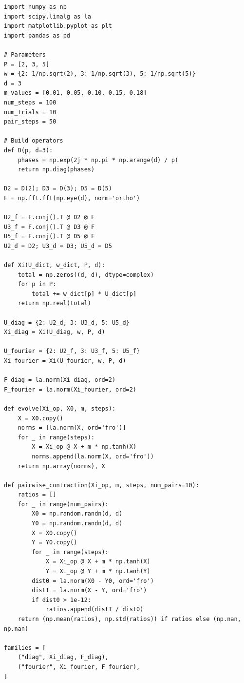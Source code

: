 \documentclass[11pt]{article}
\begin{document}
\begin{verbatim}
import numpy as np
import scipy.linalg as la
import matplotlib.pyplot as plt
import pandas as pd

# Parameters
P = [2, 3, 5]
w = {2: 1/np.sqrt(2), 3: 1/np.sqrt(3), 5: 1/np.sqrt(5)}
d = 3
m_values = [0.01, 0.05, 0.10, 0.15, 0.18]
num_steps = 100
num_trials = 10
pair_steps = 50

# Build operators
def D(p, d=3):
    phases = np.exp(2j * np.pi * np.arange(d) / p)
    return np.diag(phases)

D2 = D(2); D3 = D(3); D5 = D(5)
F = np.fft.fft(np.eye(d), norm='ortho')

U2_f = F.conj().T @ D2 @ F
U3_f = F.conj().T @ D3 @ F
U5_f = F.conj().T @ D5 @ F
U2_d = D2; U3_d = D3; U5_d = D5

def Xi(U_dict, w_dict, P, d):
    total = np.zeros((d, d), dtype=complex)
    for p in P:
        total += w_dict[p] * U_dict[p]
    return np.real(total)

U_diag = {2: U2_d, 3: U3_d, 5: U5_d}
Xi_diag = Xi(U_diag, w, P, d)

U_fourier = {2: U2_f, 3: U3_f, 5: U5_f}
Xi_fourier = Xi(U_fourier, w, P, d)

F_diag = la.norm(Xi_diag, ord=2)
F_fourier = la.norm(Xi_fourier, ord=2)

def evolve(Xi_op, X0, m, steps):
    X = X0.copy()
    norms = [la.norm(X, ord='fro')]
    for _ in range(steps):
        X = Xi_op @ X + m * np.tanh(X)
        norms.append(la.norm(X, ord='fro'))
    return np.array(norms), X

def pairwise_contraction(Xi_op, m, steps, num_pairs=10):
    ratios = []
    for _ in range(num_pairs):
        X0 = np.random.randn(d, d)
        Y0 = np.random.randn(d, d)
        X = X0.copy()
        Y = Y0.copy()
        for _ in range(steps):
            X = Xi_op @ X + m * np.tanh(X)
            Y = Xi_op @ Y + m * np.tanh(Y)
        dist0 = la.norm(X0 - Y0, ord='fro')
        distT = la.norm(X - Y, ord='fro')
        if dist0 > 1e-12:
            ratios.append(distT / dist0)
    return (np.mean(ratios), np.std(ratios)) if ratios else (np.nan, np.nan)

families = [
    ("diag", Xi_diag, F_diag),
    ("fourier", Xi_fourier, F_fourier),
]


\end{verbatim}
\end{document}
